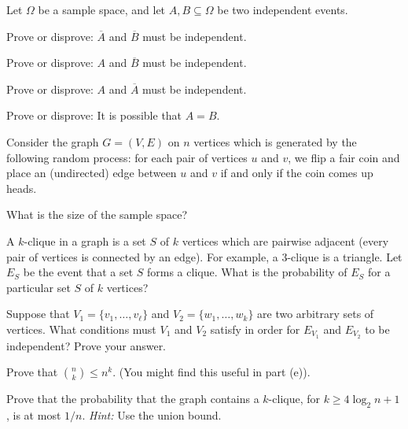 \documentclass[11pt]{article}
\begin{document}

Let $\Omega$ be a sample space, and let $A,B \subseteq \Omega$ be two independent events.

\begin{Parts}

\Part Prove or disprove: $\overline{A}$ and $\overline{B}$ must be independent.

\Part Prove or disprove: $A$ and $\overline{B}$ must be independent.

\Part Prove or disprove: $A$ and $\overline{A}$ must be independent.

\Part Prove or disprove: It is possible that $A=B$.

\end{Parts}


Consider the graph $G = (V,E)$ on $n$ vertices which is generated by the following random process: for each pair of vertices $u$ and $v$, we flip a fair coin and place an (undirected) edge between $u$ and $v$ if and only if the coin comes up heads.

\begin{Parts}
\Part What is the size of the sample space?

\Part A $k$-clique in a graph is a set $S$ of $k$ vertices which are pairwise adjacent (every pair of vertices is connected by an edge). For example, a $3$-clique is a triangle. Let $E_S$ be the event that a set $S$ forms a clique. What is the probability of $E_S$ for a particular set $S$ of $k$ vertices? 

\Part Suppose that $V_1 = \{v_1, \dots, v_{\ell}\}$ and $V_2 = \{w_1, \dots, w_k\}$ are two arbitrary sets of vertices. What conditions must $V_1$ and $V_2$ satisfy in order for $E_{V_1}$ and $E_{V_2}$ to be independent? Prove your answer.

\Part Prove that $\binom{n}{k} \le n^k$. (You might find this useful in part (e)).

\Part Prove that the probability that the graph contains a $k$-clique, for $k \geq 4{\log_2 n}+1$, is at most $1/n$. \textit{Hint:} Use the union bound.
\end{Parts}

\end{document}
